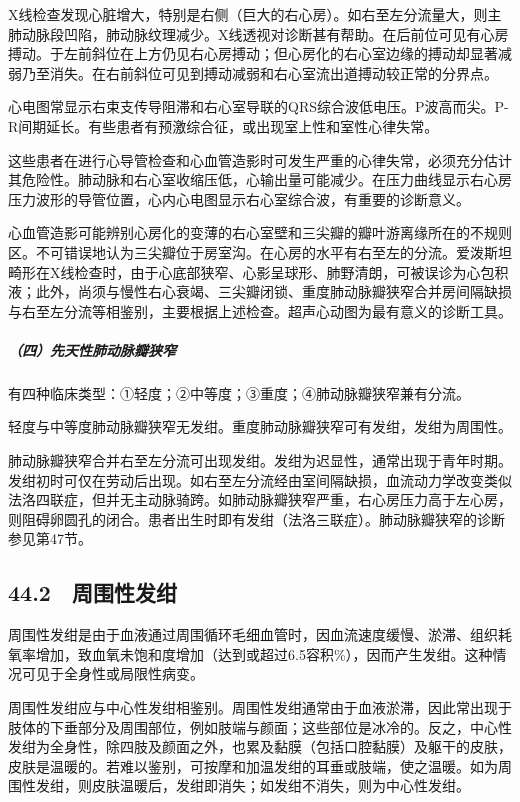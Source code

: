 X线检查发现心脏增大，特别是右侧（巨大的右心房）。如右至左分流量大，则主肺动脉段凹陷，肺动脉纹理减少。X线透视对诊断甚有帮助。在后前位可见有心房搏动。于左前斜位在上方仍见右心房搏动；但心房化的右心室边缘的搏动却显著减弱乃至消失。在右前斜位可见到搏动减弱和右心室流出道搏动较正常的分界点。

心电图常显示右束支传导阻滞和右心室导联的QRS综合波低电压。P波高而尖。P-R间期延长。有些患者有预激综合征，或出现室上性和室性心律失常。

这些患者在进行心导管检查和心血管造影时可发生严重的心律失常，必须充分估计其危险性。肺动脉和右心室收缩压低，心输出量可能减少。在压力曲线显示右心房压力波形的导管位置，心内心电图显示右心室综合波，有重要的诊断意义。

心血管造影可能辨别心房化的变薄的右心室壁和三尖瓣的瓣叶游离缘所在的不规则区。不可错误地认为三尖瓣位于房室沟。在心房的水平有右至左的分流。爱泼斯坦畸形在X线检查时，由于心底部狭窄、心影呈球形、肺野清朗，可被误诊为心包积液；此外，尚须与慢性右心衰竭、三尖瓣闭锁、重度肺动脉瓣狭窄合并房间隔缺损与右至左分流等相鉴别，主要根据上述检查。超声心动图为最有意义的诊断工具。

\subparagraph{（四）先天性肺动脉瓣狭窄}

有四种临床类型：①轻度；②中等度；③重度；④肺动脉瓣狭窄兼有分流。

轻度与中等度肺动脉瓣狭窄无发绀。重度肺动脉瓣狭窄可有发绀，发绀为周围性。

肺动脉瓣狭窄合并右至左分流可出现发绀。发绀为迟显性，通常出现于青年时期。发绀初时可仅在劳动后出现。如右至左分流经由室间隔缺损，血流动力学改变类似法洛四联症，但并无主动脉骑跨。如肺动脉瓣狭窄严重，右心房压力高于左心房，则阻碍卵圆孔的闭合。患者出生时即有发绀（法洛三联症）。肺动脉瓣狭窄的诊断参见第47节。

\protect\hypertarget{text00121.html}{}{}

\subsection{44.2　周围性发绀}

周围性发绀是由于血液通过周围循环毛细血管时，因血流速度缓慢、淤滞、组织耗氧率增加，致血氧未饱和度增加（达到或超过6.5容积\%），因而产生发绀。这种情况可见于全身性或局限性病变。

周围性发绀应与中心性发绀相鉴别。周围性发绀通常由于血液淤滞，因此常出现于肢体的下垂部分及周围部位，例如肢端与颜面；这些部位是冰冷的。反之，中心性发绀为全身性，除四肢及颜面之外，也累及黏膜（包括口腔黏膜）及躯干的皮肤，皮肤是温暖的。若难以鉴别，可按摩和加温发绀的耳垂或肢端，使之温暖。如为周围性发绀，则皮肤温暖后，发绀即消失；如发绀不消失，则为中心性发绀。

